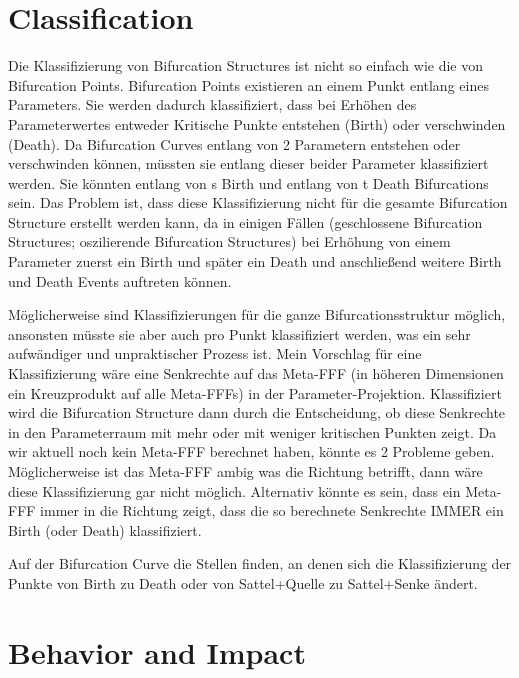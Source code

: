 \documentclass[11pt]{article}
\begin{document}
\section{Classification}
Die Klassifizierung von Bifurcation Structures ist nicht so einfach wie die von Bifurcation Points.
Bifurcation Points existieren an einem Punkt entlang eines Parameters. Sie werden dadurch klassifiziert, dass bei Erhöhen des Parameterwertes entweder Kritische Punkte entstehen (Birth) oder verschwinden (Death).
Da Bifurcation Curves entlang von 2 Parametern entstehen oder verschwinden können, müssten sie entlang dieser beider Parameter klassifiziert werden.
Sie könnten entlang von s Birth und entlang von t Death Bifurcations sein.
Das Problem ist, dass diese Klassifizierung nicht für die gesamte Bifurcation Structure erstellt werden kann, da in einigen Fällen (geschlossene Bifurcation Structures; oszilierende Bifurcation Structures) bei Erhöhung von einem Parameter zuerst ein Birth und später ein Death und anschließend weitere Birth und Death Events auftreten können.

Möglicherweise sind Klassifizierungen für die ganze Bifurcationsstruktur möglich, ansonsten müsste sie aber auch pro Punkt klassifiziert werden, was ein sehr aufwändiger und unpraktischer Prozess ist.
Mein Vorschlag für eine Klassifizierung wäre eine Senkrechte auf das Meta-FFF (in höheren Dimensionen ein Kreuzprodukt auf alle Meta-FFFs) in der Parameter-Projektion. Klassifiziert wird die Bifurcation Structure dann durch die Entscheidung, ob diese Senkrechte in den Parameterraum mit mehr oder mit weniger kritischen Punkten zeigt.
Da wir aktuell noch kein Meta-FFF berechnet haben, könnte es 2 Probleme geben. Möglicherweise ist das Meta-FFF ambig was die Richtung betrifft, dann wäre diese Klassifizierung gar nicht möglich. Alternativ könnte es sein, dass ein Meta-FFF immer in die Richtung zeigt, dass die so berechnete Senkrechte IMMER ein Birth (oder Death) klassifiziert.

Auf der Bifurcation Curve die Stellen finden, an denen sich die Klassifizierung der Punkte von Birth zu Death oder von Sattel+Quelle zu Sattel+Senke ändert.

\section{Behavior and Impact}
\end{document}
